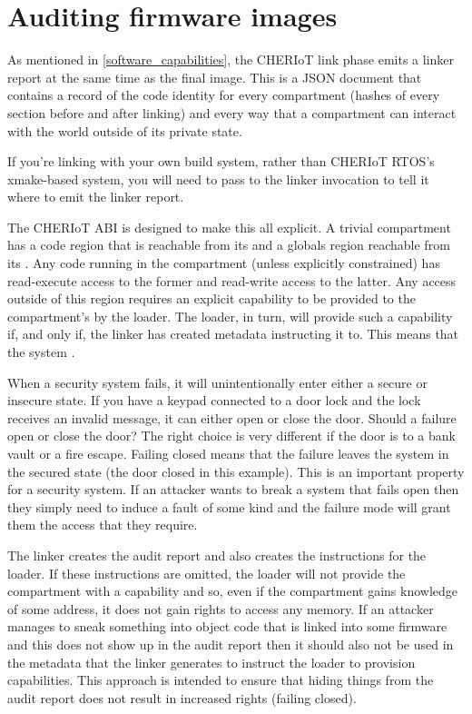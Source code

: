 \chapter[label="cheriot-audit"]{Auditing firmware images}

As mentioned in \ref{software_capabilities}, the CHERIoT link phase emits a linker report at the same time as the final image.
This is a JSON document that contains a record of the code identity for every compartment (hashes of every section before and after linking) and every way that a compartment can interact with the world outside of its private state.

\begin{note}
	If you're linking with your own build system, rather than CHERIoT RTOS's xmake-based system, you will need to pass  to the linker invocation to tell it where to emit the linker report.
\end{note}

The CHERIoT ABI is designed to make this all explicit.
A trivial compartment has a code region that is reachable from its  and a globals region reachable from its .
Any code running in the compartment (unless explicitly constrained) has read-execute access to the former and read-write access to the latter.
Any access outside of this region requires an explicit capability to be provided to the compartment's  by the loader.
The loader, in turn, will provide such a capability if, and only if, the linker has created metadata instructing it to.
This means that the system .

When a security system fails, it will unintentionally enter either a secure or insecure state.
If you have a keypad connected to a door lock and the lock receives an invalid message, it can either open or close the door.
Should a failure open or close the door?
The right choice is very different if the door is to a bank vault or a fire escape.
Failing closed means that the failure leaves the system in the secured state (the door closed in this example).
This is an important property for a security system.
If an attacker wants to break a system that fails open then they simply need to induce a fault of some kind and the failure mode will grant them the access that they require.

The linker creates the audit report and also creates the instructions for the loader.
If these instructions are omitted, the loader will not provide the compartment with a capability and so, even if the compartment gains knowledge of some address, it does not gain rights to access any memory.
If an attacker manages to sneak something into object code that is linked into some firmware and this does not show up in the audit report then it should also not be used in the metadata that the linker generates to instruct the loader to provision capabilities.
This approach is intended to ensure that hiding things from the audit report does not result in increased rights (failing closed).

